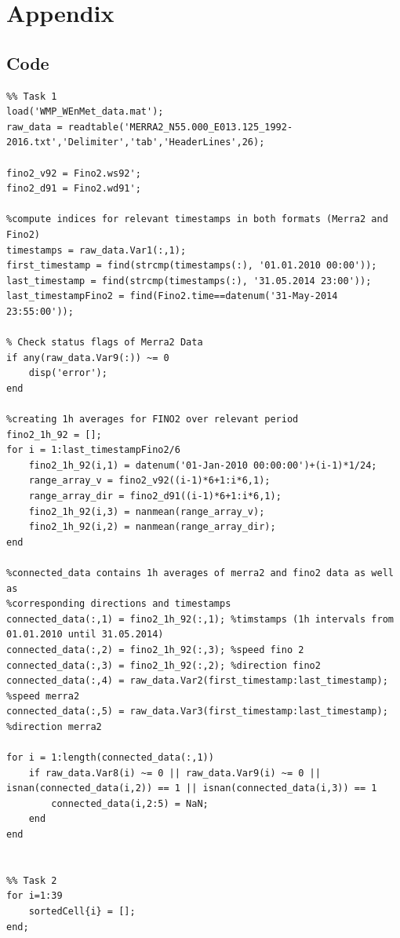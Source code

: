 \documentclass[10pt]{article}
\begin{document}
\newpage

\appendix
\section{Appendix}
\subsection{Code}
\begin{lstlisting}
%% Task 1
load('WMP_WEnMet_data.mat');
raw_data = readtable('MERRA2_N55.000_E013.125_1992-2016.txt','Delimiter','tab','HeaderLines',26);

fino2_v92 = Fino2.ws92';
fino2_d91 = Fino2.wd91';

%compute indices for relevant timestamps in both formats (Merra2 and Fino2)
timestamps = raw_data.Var1(:,1);
first_timestamp = find(strcmp(timestamps(:), '01.01.2010 00:00'));
last_timestamp = find(strcmp(timestamps(:), '31.05.2014 23:00'));
last_timestampFino2 = find(Fino2.time==datenum('31-May-2014 23:55:00'));

% Check status flags of Merra2 Data
if any(raw_data.Var9(:)) ~= 0
    disp('error');
end

%creating 1h averages for FINO2 over relevant period
fino2_1h_92 = [];
for i = 1:last_timestampFino2/6
    fino2_1h_92(i,1) = datenum('01-Jan-2010 00:00:00')+(i-1)*1/24;
    range_array_v = fino2_v92((i-1)*6+1:i*6,1);
    range_array_dir = fino2_d91((i-1)*6+1:i*6,1);
    fino2_1h_92(i,3) = nanmean(range_array_v);
    fino2_1h_92(i,2) = nanmean(range_array_dir);
end

%connected_data contains 1h averages of merra2 and fino2 data as well as
%corresponding directions and timestamps
connected_data(:,1) = fino2_1h_92(:,1); %timstamps (1h intervals from 01.01.2010 until 31.05.2014)
connected_data(:,2) = fino2_1h_92(:,3); %speed fino 2
connected_data(:,3) = fino2_1h_92(:,2); %direction fino2
connected_data(:,4) = raw_data.Var2(first_timestamp:last_timestamp); %speed merra2
connected_data(:,5) = raw_data.Var3(first_timestamp:last_timestamp); %direction merra2

for i = 1:length(connected_data(:,1))
    if raw_data.Var8(i) ~= 0 || raw_data.Var9(i) ~= 0 || isnan(connected_data(i,2)) == 1 || isnan(connected_data(i,3)) == 1
        connected_data(i,2:5) = NaN;
    end
end


%% Task 2
for i=1:39
    sortedCell{i} = [];
end;


\end{lstlisting}
\end{document}
